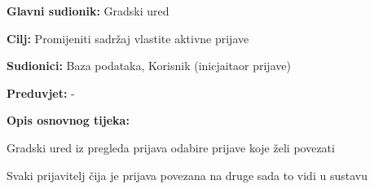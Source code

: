 					\noindent {}
					\begin{packed_item}
	
						\item \textbf{Glavni sudionik: }Gradski ured
						\item  \textbf{Cilj:} Promijeniti sadržaj vlastite aktivne prijave
						\item  \textbf{Sudionici:} Baza podataka, Korisnik (inicjaitaor prijave)
						\item  \textbf{Preduvjet:} -
						\item  \textbf{Opis osnovnog tijeka:}
						
						\item[] \begin{packed_enum}
	
							\item Gradski ured iz pregleda prijava odabire prijave koje želi povezati
							\item Svaki prijavitelj čija je prijava povezana na druge sada to vidi u sustavu
						\end{packed_enum}
						
					\end{packed_item}
					
					\pagebreak
					
